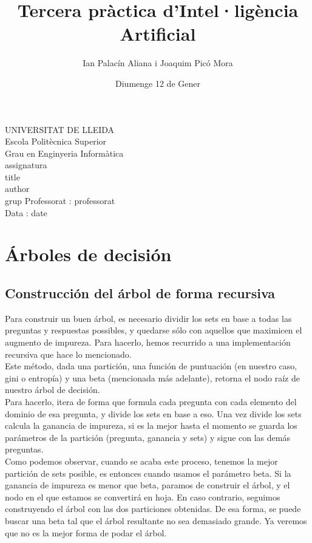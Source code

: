 \documentclass{article}
\title{Tercera pràctica d'Intel·ligència Artificial}
\author{Ian Palacín Aliana i Joaquim Picó Mora}
\date{Diumenge 12 de Gener}
\renewcommand{\maketitle}{ %
    \begin{titlepage}
        \raggedright{UNIVERSITAT DE LLEIDA \\
            Escola Politècnica Superior \\
            Grau en Enginyeria Informàtica\\
            \1assignatura\\}
            \vspace{5cm}
            \centering\huge{\5title \\}
            \vspace{3cm}
            \large{\6author} \\
            \normalsize{\3grup}
            \vfill
            Professorat : \4professorat \\
            Data : \7date
\end{titlepage}}
\begin{document}
\maketitle
\thispagestyle{empty}

\newpage
{}
\tableofcontents
\newpage
{}
%

\section{Árboles de decisión}
\subsection{Construcción del árbol de forma recursiva}
Para construir un buen árbol, es necesario
dividir los sets en base a todas las preguntas y respuestas
possibles, y quedarse sólo con aquellos que maximicen el augmento
de impureza. Para hacerlo, hemos recurrido a una implementación
recursiva que hace lo mencionado.\\
Este método, dada una partición, una función de puntuación (en nuestro
caso, gini o entropía) y una beta (mencionada más adelante), retorna
el nodo raíz de nuestro árbol de decisión.\\
Para hacerlo, itera de forma que formula cada pregunta con cada elemento
del dominio de esa pregunta, y divide los sets en base a eso. Una vez divide
los sets calcula la ganancia de impureza, si es la mejor hasta el momento se
guarda los parámetros de la partición (pregunta, ganancia y sets) y sigue 
con las demás preguntas.\\
Como podemos observar, cuando se acaba este proceso, tenemos la mejor
partición de sets posible, es entonces cuando usamos el parámetro beta. Si
la ganancia de impureza es menor que beta, paramos de construir el árbol, y el 
nodo en el que estamos se convertirá en hoja. En
caso contrario, seguimos construyendo el árbol con las dos particiones obtenidas.
De esa forma, se puede buscar una beta tal que el árbol resultante no sea demasiado
grande. Ya veremos que no es la mejor forma de podar el árbol.
%
\end{document}
